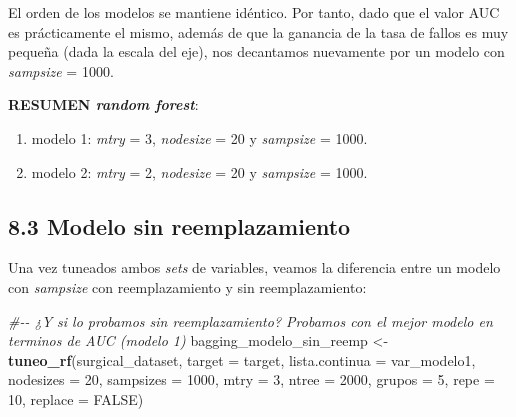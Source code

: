 \documentclass[
]{article}
\newenvironment{Shaded}{\begin{snugshade}}{\end{snugshade}}
\newcommand{\CommentTok}[1]{\textcolor[rgb]{0.56,0.35,0.01}{\textit{#1}}}
\newcommand{\DataTypeTok}[1]{\textcolor[rgb]{0.13,0.29,0.53}{#1}}
\newcommand{\DecValTok}[1]{\textcolor[rgb]{0.00,0.00,0.81}{#1}}
\newcommand{\KeywordTok}[1]{\textcolor[rgb]{0.13,0.29,0.53}{\textbf{#1}}}
\newcommand{\NormalTok}[1]{#1}
\newcommand{\OtherTok}[1]{\textcolor[rgb]{0.56,0.35,0.01}{#1}}
\newcommand{\StringTok}[1]{\textcolor[rgb]{0.31,0.60,0.02}{#1}}
\providecommand{\tightlist}{%
  \setlength{\itemsep}{0pt}\setlength{\parskip}{0pt}}
\begin{document}
El orden de los modelos se mantiene idéntico. Por tanto, dado que el
valor AUC es prácticamente el mismo, además de que la ganancia de la
tasa de fallos es muy pequeña (dada la escala del eje), nos decantamos
nuevamente por un modelo con \emph{sampsize} = 1000.

\textbf{RESUMEN \emph{random forest}}:

\begin{enumerate}
\def\labelenumi{\arabic{enumi}.}
\tightlist
\item
  modelo 1: \emph{mtry} = 3, \emph{nodesize} = 20 y \emph{sampsize} =
  1000.
\item
  modelo 2: \emph{mtry} = 2, \emph{nodesize} = 20 y \emph{sampsize} =
  1000.
\end{enumerate}

\hypertarget{modelo-sin-reemplazamiento-1}{%
\subsection{8.3 Modelo sin
reemplazamiento}\label{modelo-sin-reemplazamiento-1}}

Una vez tuneados ambos \emph{sets} de variables, veamos la diferencia
entre un modelo con \emph{sampsize} con reemplazamiento y sin
reemplazamiento:

\begin{Shaded}
\begin{Highlighting}[]
\CommentTok{\#{-}{-} ¿Y si lo probamos sin reemplazamiento? Probamos con el mejor modelo en terminos de AUC (modelo 1)}
\NormalTok{bagging\_modelo\_sin\_reemp <{-}}\StringTok{ }\KeywordTok{tuneo\_rf}\NormalTok{(surgical\_dataset, }\DataTypeTok{target =}\NormalTok{ target,}
                                     \DataTypeTok{lista.continua =}\NormalTok{ var\_modelo1, }\DataTypeTok{nodesizes =} \DecValTok{20}\NormalTok{, }
                                     \DataTypeTok{sampsizes =} \DecValTok{1000}\NormalTok{, }\DataTypeTok{mtry =} \DecValTok{3}\NormalTok{, }\DataTypeTok{ntree =} \DecValTok{2000}\NormalTok{, }
                                     \DataTypeTok{grupos =} \DecValTok{5}\NormalTok{, }\DataTypeTok{repe =} \DecValTok{10}\NormalTok{, }\DataTypeTok{replace =} \OtherTok{FALSE}\NormalTok{)}
\end{Highlighting}
\end{Shaded}
\end{document}
